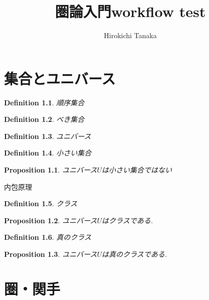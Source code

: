 \documentclass{jsbook}
\title{圏論入門workflow test}
\author{Hirokichi Tanaka}
\theoremstyle{plain}
\newtheorem{Def}{Definition}[chapter]
\newtheorem{Prop}{Proposition}[chapter]
\begin{document}
\maketitle

\tableofcontents
\newpage
\chapter{集合とユニバース}
\begin{Def}
順序集合
\end{Def}
\begin{Def}
べき集合
\end{Def}
\begin{Def}
ユニバース
\end{Def}
\begin{Def}
小さい集合
\end{Def}
\begin{Prop}
ユニバース$U$は小さい集合ではない
\end{Prop}
内包原理

\begin{Def}
クラス
\end{Def}
\begin{Prop}
ユニバース$U$はクラスである.
\end{Prop}
\begin{Def}
真のクラス
\end{Def}
\begin{Prop}
ユニバース$U$は真のクラスである.
\end{Prop}
\chapter{圏・関手}
\end{document}
